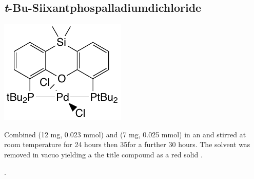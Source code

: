 \subsection*{\emph{t}-Bu-Siixantphospalladiumdichloride} 
\begin{structure}[h]
\begin{center}
\includegraphics{../Structures/PdCl2(Si(tBu)2)_complex.pdf}
\end{center}
\end{structure}

Combined  (12 mg, 0.023 mmol) and \ce{[Pd(COD)Cl2]} (7 mg, 0.025 mmol) in an  and stirred at room temperature for 24 hours then 35\degC for a further 30 hours.  The solvent was removed in vacuo yielding a the title compound as a red solid .

.

